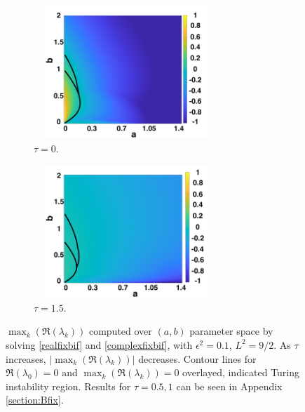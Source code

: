 \begin{figure}[H]
    \centering
    \begin{subfigure}[t]{0.45\textwidth}
        \centering
        \includegraphics[width=7cm,height=5cm]{fixbif21.png}
        \caption{$\tau=0$.}
        \label{}
    \end{subfigure}
    \hfill
    \begin{subfigure}[t]{0.45\textwidth}
        \centering
        \includegraphics[width=7cm,height=5cm]{fixbif24.png}
        \caption{$\tau=1.5$.}
        \label{}
    \end{subfigure}
    \caption{$\max_k(\Re(\lambda_k))$ computed over $(a,b)$ parameter space by solving \eqref{realfixbif} and \eqref{complexfixbif}, with $\epsilon^2=0.1$, $L^2=9/2$. As $\tau$ increases, $|\max_k(\Re(\lambda_k))|$ decreases. Contour lines for $\Re(\lambda_0)=0$ and $\max_k(\Re(\lambda_k))=0$ overlayed, indicated Turing instability region. Results for $\tau=0.5,1$ can be seen in Appendix \ref{section:Bfix}.}
    \label{fig:fixbif2}
\end{figure}
